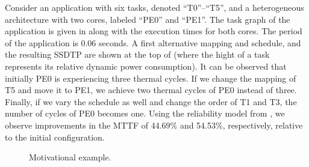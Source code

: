 Consider an application with six tasks, denoted ``T0''--``T5'', and a heterogeneous architecture with two cores, labeled ``PE0'' and ``PE1''. The task graph of the application is given in  along with the execution times for both cores. The period of the application is 0.06 seconds. A first alternative mapping and schedule, and the resulting SSDTP are shown at the top of  (where the hight of a task represents its relative dynamic power consumption). It can be observed that initially PE0 is experiencing three thermal cycles. If we change the mapping of T5 and move it to PE1, we achieve two thermal cycles of PE0 instead of three. Finally, if we vary the schedule as well and change the order of T1 and T3, the number of cycles of PE0 becomes one. Using the reliability model from , we observe improvements in the MTTF of 44.69\% and 54.53\%, respectively, relative to the initial configuration.
\begin{figure}
  \centering
  \vspace{-15pt}

  \vspace{5pt}
  \caption{Motivational example.}
  \vspace{15pt}
\end{figure}
